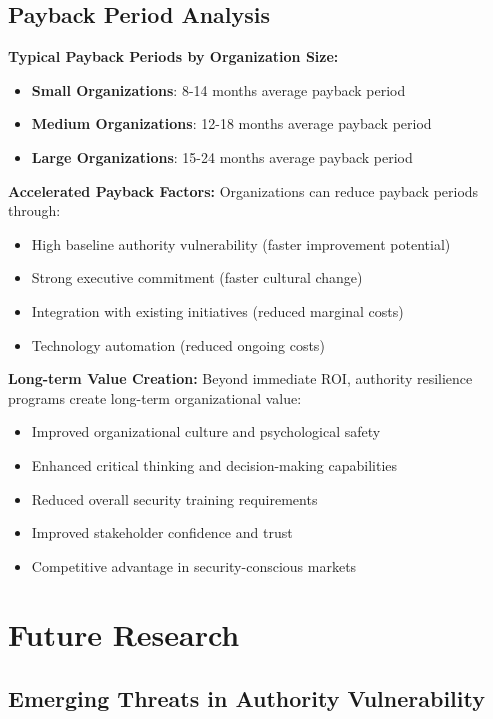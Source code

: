 \documentclass[11pt,a4paper]{article}
\begin{document}
\subsection{Payback Period Analysis}

\textbf{Typical Payback Periods by Organization Size:}
\begin{itemize}
\item \textbf{Small Organizations}: 8-14 months average payback period
\item \textbf{Medium Organizations}: 12-18 months average payback period  
\item \textbf{Large Organizations}: 15-24 months average payback period
\end{itemize}

\textbf{Accelerated Payback Factors:}
Organizations can reduce payback periods through:
\begin{itemize}
\item High baseline authority vulnerability (faster improvement potential)
\item Strong executive commitment (faster cultural change)
\item Integration with existing initiatives (reduced marginal costs)
\item Technology automation (reduced ongoing costs)
\end{itemize}

\textbf{Long-term Value Creation:}
Beyond immediate ROI, authority resilience programs create long-term organizational value:
\begin{itemize}
\item Improved organizational culture and psychological safety
\item Enhanced critical thinking and decision-making capabilities
\item Reduced overall security training requirements
\item Improved stakeholder confidence and trust
\item Competitive advantage in security-conscious markets
\end{itemize}

\section{Future Research}

\subsection{Emerging Threats in Authority Vulnerability}
\end{document}
